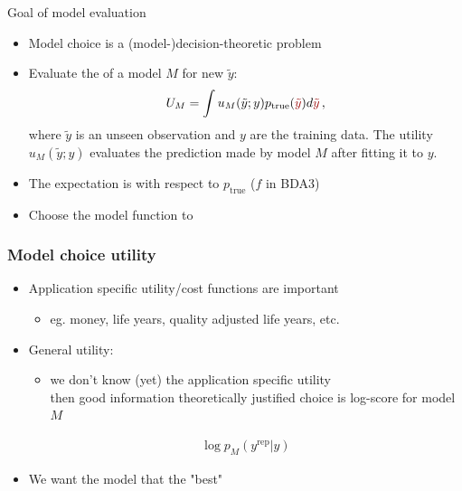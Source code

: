 \documentclass[10pt]{beamer}
\begin{document}


\begin{frame}{Goal of model evaluation}

\begin{itemize}
\item Model choice is a (model-)decision-theoretic problem
\pause
\item Evaluate the  of a model $M$ for new  $\tilde{y}$:
\[
U_M = \int u_M(\tilde{y};y) p_\text{true}({\color{uured}\tilde{y}}) d{\color{uured}\tilde{y}}\,,
\]
where $\tilde y$ is an unseen observation and $y$ are the training data.
The utility $u_M(\tilde y;y)$ evaluates the prediction made by model $M$
after fitting it to $y$.
  \pause
  \item The expectation is with respect to $p_\text{true}$ ($f$ in BDA3)
  \pause
  \item Choose the model function to 
\end{itemize}
\end{frame}

\begin{frame}

\frametitle{Model choice utility}
  \begin{itemize}
  \item Application specific utility/cost functions are important
    \begin{itemize}
      \item eg. money, life years, quality adjusted life years, etc.
    \end{itemize}
  \pause
  \item General utility: 
  \begin{itemize}
    \item we don't know (yet) the application specific utility\\
    then good information theoretically justified choice is log-score for model $M$
  \end{itemize}
      \begin{align*}
        \log p_M (y^\text{rep} | y)
      \end{align*}
    \pause
    \item We want the model that  the "best"
\end{itemize}

\end{frame}
\end{document}
